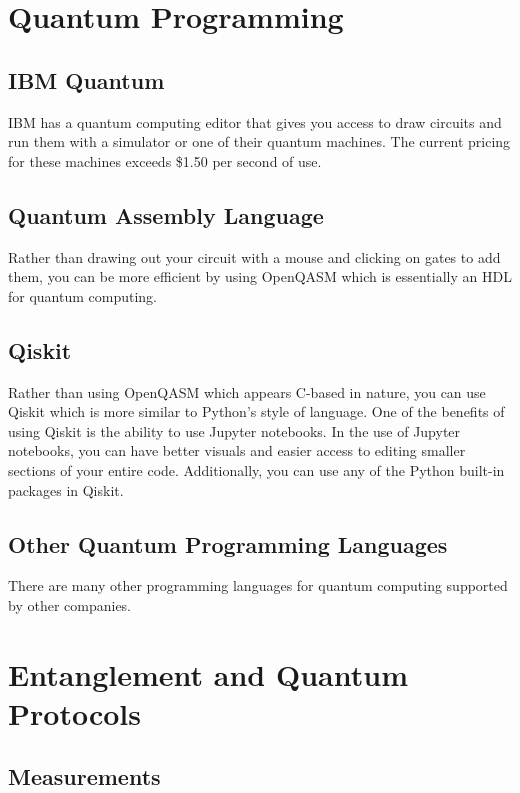 \documentclass{article}
\begin{document}
\section{Quantum Programming} %

\subsection{IBM Quantum}

IBM has a quantum computing editor that gives you access to draw circuits and run them with a simulator or one of their quantum machines. The current pricing for these machines exceeds \$1.50 per second of use.  

\subsection{Quantum Assembly Language}

Rather than drawing out your circuit with a mouse and clicking on gates to add them, you can be more efficient by using OpenQASM which is essentially an HDL for quantum computing. 

\subsection{Qiskit}

Rather than using OpenQASM which appears C-based in nature, you can use Qiskit which is more similar to Python's style of language. One of the benefits of using Qiskit is the ability to use Jupyter notebooks. In the use of Jupyter notebooks, you can have better visuals and easier access to editing smaller sections of your entire code. Additionally, you can use any of the Python built-in packages in Qiskit.

\subsection{Other Quantum Programming Languages}

There are many other programming languages for quantum computing supported by other companies.

\section{Entanglement and Quantum Protocols} %

\subsection{Measurements}
\end{document}
